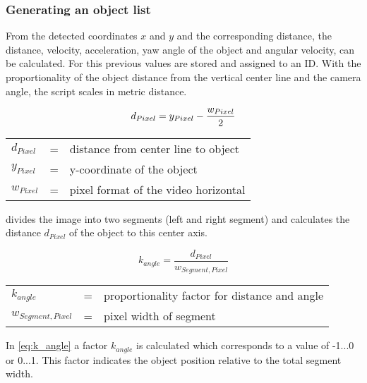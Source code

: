 \subsubsection{Generating an object list}
From the detected coordinates $x$ and $y$ and the corresponding distance, the distance, velocity, acceleration, yaw angle of the object and angular velocity, can be calculated. For this previous values are stored and assigned to an \ac{ID}. With the proportionality of the object distance from the vertical center line and the camera angle, the script scales in metric distance.

\begin{equation}
		d_{Pixel} = y_{Pixel} -  \frac{w_{Pixel}}{2}\\	
		\label{eq:d_Pixel}
\end{equation}
\begin{table}[!h]
	\begin{center}
		\begin{tabular}{l c l}
			$d_{Pixel}$ & = & distance from center line to object\\
			$y_{Pixel}$ & = &  y-coordinate of the object\\
			$w_{Pixel}$ & = & pixel format of the video horizontal\\
		\end{tabular}
	\end{center}
\end{table}


 divides the image into two segments (left and right segment) and calculates the distance $d_{Pixel}$ of the object to this center axis.

\begin{equation}
k_{angle}  = \frac{d_{Pixel}}{w_{Segment,Pixel}}
\label{eq:k_angle}
\end{equation}
\begin{table}[!h]
	\begin{center}
		\begin{tabular}{l c l}
			$k_{angle}$ & = & proportionality factor for distance and angle\\
			$w_{Segment,Pixel}$ & = &  pixel width of segment\\
		\end{tabular}
	\end{center}
\end{table}

In \cref{eq:k_angle} a factor $k_{angle}$ is calculated which corresponds to a value of -1...0 or 0...1. This factor indicates the object position relative to the total segment width.

